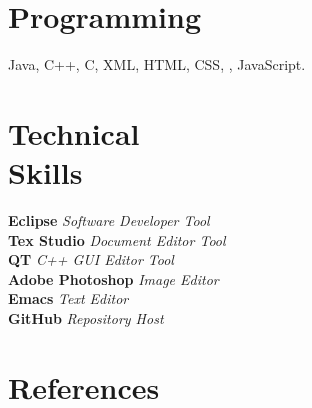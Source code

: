 \documentclass[margin,line]{resume}
\begin{document}
\begin{resume}
    \section{\mysidestyle Programming} 

    Java, C++, C, XML, HTML, CSS, \LaTeXe, JavaScript.

   \section{\mysidestyle Technical\\ Skills}

    \textbf{Eclipse} \hfill
    \textsl{Software Developer Tool}
    \vspace{1mm}\\
  	\textbf{Tex Studio} \hfill
    \textsl{Document Editor Tool}  \vspace{1mm}\\	
    \textbf{QT} \hfill
     \textsl{C++ GUI Editor Tool}  \vspace{1mm}\\
     \textbf{Adobe Photoshop} \hfill
     \textsl{Image Editor}  
     \vspace{1mm}\\
     \textbf{Emacs} \hfill
     \textsl{Text Editor} 
      \vspace{1mm}\\  
      \textbf{GitHub} \hfill
      \textsl{Repository Host} 
      \vspace{1mm}\\                
                                       



\section{\mysidestyle References} 




\end{resume}
\end{document}

